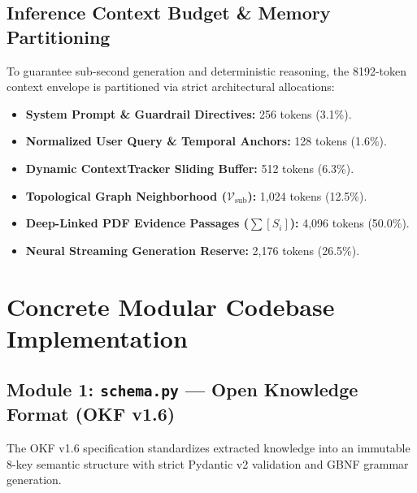 \documentclass[10pt,a4paper]{article}
\begin{document}
\subsection{Inference Context Budget \& Memory Partitioning}
To guarantee sub-second generation and deterministic reasoning, the 8192-token context envelope is partitioned via strict architectural allocations:
\begin{itemize}\setlength{\itemsep}{1pt}\setlength{\parskip}{0pt}
\item \textbf{System Prompt \& Guardrail Directives:} 256 tokens (3.1\%).
\item \textbf{Normalized User Query \& Temporal Anchors:} 128 tokens (1.6\%).
\item \textbf{Dynamic ContextTracker Sliding Buffer:} 512 tokens (6.3\%).
\item \textbf{Topological Graph Neighborhood ($\mathcal{V}_{\text{sub}}$):} 1,024 tokens (12.5\%).
\item \textbf{Deep-Linked PDF Evidence Passages ($\sum [S_i]$):} 4,096 tokens (50.0\%).
\item \textbf{Neural Streaming Generation Reserve:} 2,176 tokens (26.5\%).
\end{itemize}

\newpage

\section{Concrete Modular Codebase Implementation}
\subsection{Module 1: \texttt{schema.py} --- Open Knowledge Format (OKF v1.6)}
The OKF v1.6 specification standardizes extracted knowledge into an immutable 8-key semantic structure with strict Pydantic v2 validation and GBNF grammar generation.
\end{document}

